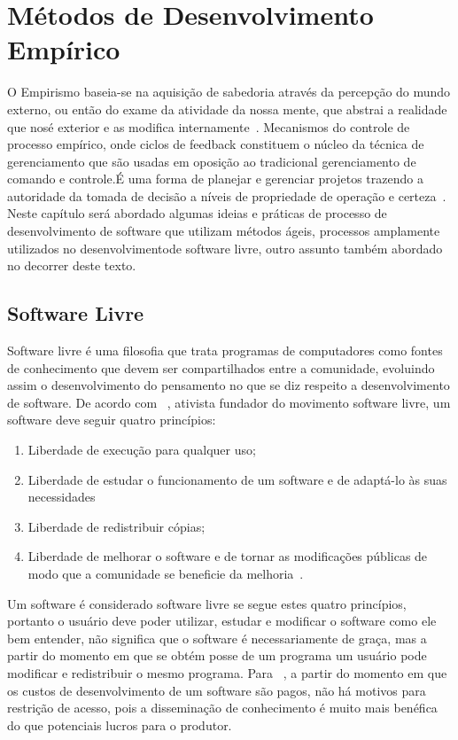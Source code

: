 
\chapter{Métodos de Desenvolvimento Empírico}
\label{cap:desenvolvimento-empirico}

O Empirismo baseia-se na aquisição de sabedoria através da percepção do mundo 
externo, ou então do exame da atividade da nossa mente, que abstrai a realidade 
que nosé exterior e as modifica internamente~\cite{chaui2003}.
%
Mecanismos do controle de processo empírico, onde ciclos de feedback constituem o
núcleo da técnica de gerenciamento que são usadas em oposição ao tradicional 
gerenciamento de comando e controle.É uma forma de planejar e gerenciar projetos 
trazendo a autoridade da tomada de decisão a níveis de propriedade de operação e 
certeza~\cite{Schwaber2004}.
%
Neste capítulo será abordado algumas ideias e práticas de processo de desenvolvimento
de software que utilizam métodos ágeis, processos amplamente utilizados no 
desenvolvimentode software livre, outro assunto também abordado no decorrer 
deste texto.
%
\section{Software Livre}

Software livre é uma filosofia que trata programas de computadores como fontes de 
conhecimento que devem ser compartilhados entre a comunidade, evoluindo assim o 
desenvolvimento do pensamento no que se diz respeito a desenvolvimento de software.
%
De acordo com ~, ativista fundador do movimento software livre, 
um software deve seguir quatro princípios:
%
\begin{enumerate}
\item Liberdade de execução para qualquer uso;
\item Liberdade de estudar o funcionamento de um software e de adaptá-lo às suas 
necessidades
\item Liberdade de redistribuir cópias;
\item Liberdade de melhorar o software e de tornar as modificações públicas de modo 
que a comunidade se beneficie da melhoria~\cite{stallman2001}.
\end{enumerate}
%
Um software é considerado software livre se segue estes quatro princípios, portanto 
o usuário deve poder utilizar, estudar e modificar o software como ele bem entender, 
não significa que o software é necessariamente de graça, mas a partir do momento em 
que se obtém posse de um programa um usuário pode modificar e redistribuir o mesmo 
programa.
%
Para ~, a partir do momento em que os custos de desenvolvimento de um software 
são pagos, não há motivos para restrição de acesso, pois a disseminação de conhecimento 
é muito mais benéfica do que potenciais lucros para o produtor.
%

